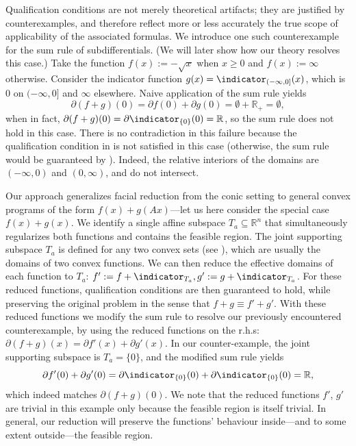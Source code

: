 \documentclass{article}
\theoremstyle{plain}
\theoremstyle{definition}
\theoremstyle{remark}
\begin{document}
Qualification conditions are not merely theoretical artifacts; they are
justified by counterexamples, and therefore
reflect more or less accurately the true scope of applicability of the
associated formulas.
We introduce one such counterexample for the sum rule of subdifferentials.
(We will later show how our theory resolves this case.)
Take the function $f(x) := -\sqrt{x}$ when $x \ge 0$ and $f(x) := \infty$ otherwise.
Consider the indicator function $g(x)= \indicator_{(-\infty,  0]}(x)$, 
which is $0$ on $(-\infty, 0]$ and $\infty$ elsewhere.
Naive application of the sum rule yields 
\begin{equation*}
\partial (f+g)(0) =  \partial f(0) + \partial g(0)= \emptyset + \mathbb{R}_+ =
\emptyset,
\end{equation*}
when in fact, $\partial (f+g)(0)= \partial \indicator_{\{0\}}(0) = \mathbb{R}$, so the sum
rule does not hold in this case.
There is no contradiction in this failure because 
the qualification condition in  is not satisfied in this case (otherwise, the sum rule would be guaranteed by \cite[Theorem 23.8]{rockafellarConvexAnalysis1970}).
Indeed, the relative interiors
of the domains are $(-\infty,  0)$ and $(0, \infty)$,
and do not intersect.

Our approach generalizes facial reduction from the conic setting to general
convex programs
of the form $f(x) + g(Ax)$---let us here consider the special case $f(x) + g(x)$. We identify a single affine subspace $T_a \subseteq
\mathbb{R}^n$ that simultaneously regularizes both functions and contains the feasible region.
The joint supporting subspace $T_a$ is defined for any two convex sets (see ), which are usually the domains of two convex functions. 
We can then reduce the effective domains of each function to $T_a$: $f' := f + \indicator_{T_a}, g' := g + \indicator_{T_a}$. For these reduced functions, qualification conditions are then guaranteed to hold, while preserving the original problem in the sense that $f+g \equiv f' + g'$. 
With these reduced functions we modify the sum rule to resolve our previously encountered
counterexample, by using the reduced functions on the r.h.s: $\partial (f+g)(x) = \partial f'(x) + \partial g'(x)$. In our counter-example, the joint supporting subspace is $T_a = \{0\}$, and the modified
sum rule yields 
\begin{equation*}
\partial f'(0) + \partial g'(0) =
\partial \indicator_{\{0\}}(0) + \partial \indicator_{\{0\}}(0) = \mathbb{R},
\end{equation*}
which indeed matches $\partial(f+g)(0)$.
We note that the reduced functions $f'$, $g'$ are trivial in this example
only because the feasible region is itself trivial. In general, our reduction will preserve the functions' behaviour inside---and to some extent outside---the feasible region.
\end{document}
